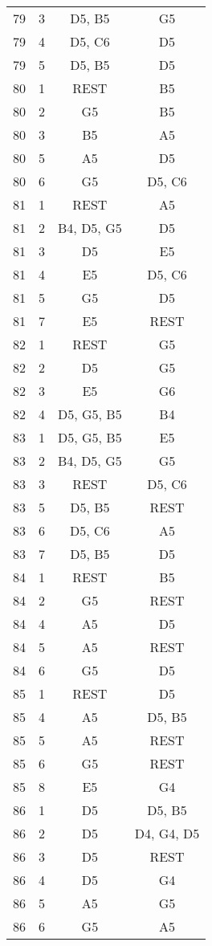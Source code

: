 \documentclass{article}
\begin{document}
\begin{longtable}{|c|c|c|c|}
79 & 3 & D5, B5 & G5 \\ 
79 & 4 & D5, C6 & D5 \\ 
79 & 5 & D5, B5 & D5 \\ 
\hline
80 & 1 & REST & B5 \\ 
80 & 2 & G5 & B5 \\ 
80 & 3 & B5 & A5 \\ 
80 & 5 & A5 & D5 \\ 
80 & 6 & G5 & D5, C6 \\ 
\hline
81 & 1 & REST & A5 \\ 
81 & 2 & B4, D5, G5 & D5 \\ 
81 & 3 & D5 & E5 \\ 
81 & 4 & E5 & D5, C6 \\ 
81 & 5 & G5 & D5 \\ 
81 & 7 & E5 & REST \\ 
\hline
82 & 1 & REST & G5 \\ 
82 & 2 & D5 & G5 \\ 
82 & 3 & E5 & G6 \\ 
82 & 4 & D5, G5, B5 & B4 \\ 
\hline
83 & 1 & D5, G5, B5 & E5 \\ 
83 & 2 & B4, D5, G5 & G5 \\ 
83 & 3 & REST & D5, C6 \\ 
83 & 5 & D5, B5 & REST \\ 
83 & 6 & D5, C6 & A5 \\ 
83 & 7 & D5, B5 & D5 \\ 
\hline
84 & 1 & REST & B5 \\ 
84 & 2 & G5 & REST \\ 
84 & 4 & A5 & D5 \\ 
84 & 5 & A5 & REST \\ 
84 & 6 & G5 & D5 \\ 
\hline
85 & 1 & REST & D5 \\ 
85 & 4 & A5 & D5, B5 \\ 
85 & 5 & A5 & REST \\ 
85 & 6 & G5 & REST \\ 
85 & 8 & E5 & G4 \\ 
\hline
86 & 1 & D5 & D5, B5 \\ 
86 & 2 & D5 & D4, G4, D5 \\ 
86 & 3 & D5 & REST \\ 
86 & 4 & D5 & G4 \\ 
86 & 5 & A5 & G5 \\ 
86 & 6 & G5 & A5 \\ 
\hline

\end{longtable}
\end{document}
